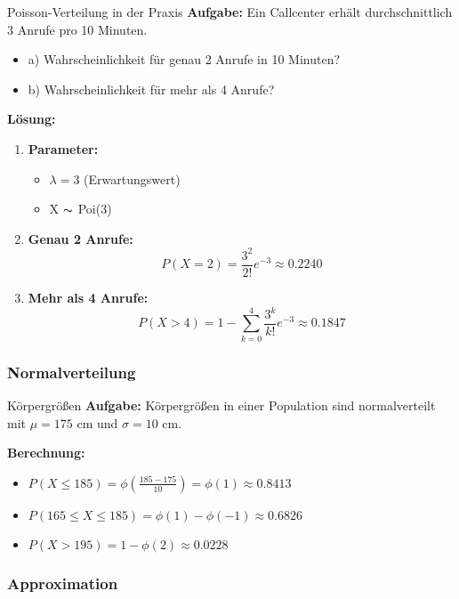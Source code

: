 \begin{example2}{Poisson-Verteilung in der Praxis}
\textbf{Aufgabe:} Ein Callcenter erhält durchschnittlich 3 Anrufe pro 10 Minuten.
\begin{itemize}
\item a) Wahrscheinlichkeit für genau 2 Anrufe in 10 Minuten?
\item b) Wahrscheinlichkeit für mehr als 4 Anrufe?
\end{itemize}

\textbf{Lösung:}
\begin{enumerate}
\item \textbf{Parameter:}
   \begin{itemize}
   \item $\lambda = 3$ (Erwartungswert)
   \item X $\thicksim$ Poi(3)
   \end{itemize}

\item \textbf{Genau 2 Anrufe:}
   $$P(X=2) = \frac{3^2}{2!}e^{-3} \approx 0.2240$$

\item \textbf{Mehr als 4 Anrufe:}
   $$P(X>4) = 1 - \sum_{k=0}^4 \frac{3^k}{k!}e^{-3} \approx 0.1847$$
\end{enumerate}
\end{example2}

\subsubsection{Normalverteilung}

\begin{example2}{Körpergrößen}
\textbf{Aufgabe:} Körpergrößen in einer Population sind normalverteilt mit $\mu = 175$ cm und $\sigma = 10$ cm.

\textbf{Berechnung:}
\begin{itemize}
\item $P(X \leq 185) = \phi(\frac{185-175}{10}) = \phi(1) \approx 0.8413$
\item $P(165 \leq X \leq 185) = \phi(1) - \phi(-1) \approx 0.6826$
\item $P(X > 195) = 1 - \phi(2) \approx 0.0228$
\end{itemize}
\end{example2}

\subsubsection{Approximation}

